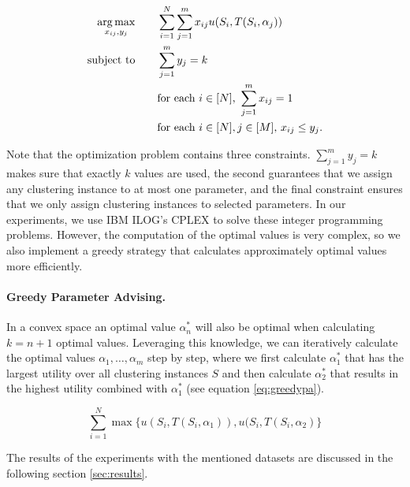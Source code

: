 \begin{align*}
  \operatorname*{arg\,max}_{x_{ij}, y_j} \qquad&\sum_{i = 1}^N \sum_{j = 1}^m x_{ij} u(S_i, T(S_i, \alpha_j)) \\
  \text{subject to} \qquad& \sum_{j=1}^m y_j = k \\
  & \text{for each $i \in [N]$, } \sum_{j=1}^m x_{ij} = 1 \\
  & \text{for each $i \in [N], j \in [M]$, } x_{ij} \leq y_j.
\end{align*}

Note that the optimization problem contains three constraints. $\sum_{j=1}^m y_j = k$ makes sure that exactly $k$ values are used, the second guarantees that we assign any clustering instance to at most one parameter, and the final constraint ensures that we only assign clustering instances to selected parameters. In our experiments, we use IBM ILOG’s CPLEX to solve these integer programming problems. However, the computation of the optimal values is very complex, so we also implement a greedy strategy that calculates approximately optimal values more efficiently.

\paragraph{Greedy Parameter Advising.} In a convex space an optimal value $\alpha_n^*$ will also be optimal when calculating $k = n + 1$ optimal values. Leveraging this knowledge, we can iteratively calculate the optimal values $\alpha_1, \dots, \alpha_m$ step by step, where we first calculate $\alpha_1^*$ that has the largest utility over all clustering instances $S$ and then calculate $\alpha_2^*$ that results in the highest utility combined with $\alpha_1^*$ (see equation \ref{eq:greedypa}).

\begin{equation}
\sum_{i=1}^N \max\{u(S_i, T(S_i, \alpha_1)), u(S_i, T(S_i, \alpha_2)\} 
\label{eq:greedypa}
\end{equation}

The results of the experiments with the mentioned datasets are discussed in the following section \ref{sec:results}.